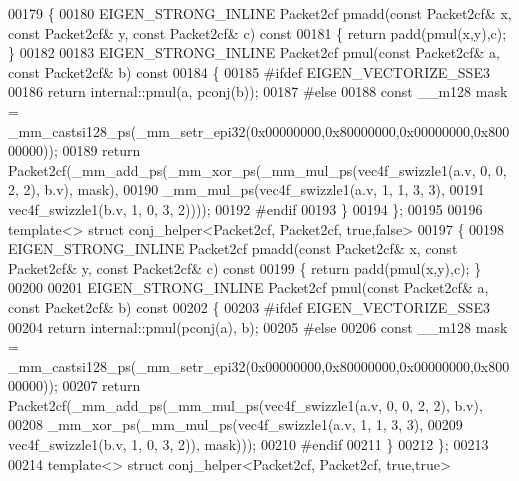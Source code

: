 \begin{DoxyCode}
00179 \{
00180   EIGEN\_STRONG\_INLINE Packet2cf pmadd(\textcolor{keyword}{const} Packet2cf& x, \textcolor{keyword}{const} Packet2cf& y, \textcolor{keyword}{const} Packet2cf& c)\textcolor{keyword}{ const}
00181 \textcolor{keyword}{  }\{ \textcolor{keywordflow}{return} padd(pmul(x,y),c); \}
00182 
00183   EIGEN\_STRONG\_INLINE Packet2cf pmul(\textcolor{keyword}{const} Packet2cf& a, \textcolor{keyword}{const} Packet2cf& b)\textcolor{keyword}{ const}
00184 \textcolor{keyword}{  }\{
00185 \textcolor{preprocessor}{    #ifdef EIGEN\_VECTORIZE\_SSE3}
00186     \textcolor{keywordflow}{return} internal::pmul(a, pconj(b));
00187 \textcolor{preprocessor}{    #else}
00188     \textcolor{keyword}{const} \_\_m128 mask = \_mm\_castsi128\_ps(\_mm\_setr\_epi32(0x00000000,0x80000000,0x00000000,0x80000000));
00189     \textcolor{keywordflow}{return} Packet2cf(\_mm\_add\_ps(\_mm\_xor\_ps(\_mm\_mul\_ps(vec4f\_swizzle1(a.v, 0, 0, 2, 2), b.v), mask),
00190                                 \_mm\_mul\_ps(vec4f\_swizzle1(a.v, 1, 1, 3, 3),
00191                                            vec4f\_swizzle1(b.v, 1, 0, 3, 2))));
00192 \textcolor{preprocessor}{    #endif}
00193   \}
00194 \};
00195 
00196 \textcolor{keyword}{template}<> \textcolor{keyword}{struct }conj\_helper<Packet2cf, Packet2cf, true,false>
00197 \{
00198   EIGEN\_STRONG\_INLINE Packet2cf pmadd(\textcolor{keyword}{const} Packet2cf& x, \textcolor{keyword}{const} Packet2cf& y, \textcolor{keyword}{const} Packet2cf& c)\textcolor{keyword}{ const}
00199 \textcolor{keyword}{  }\{ \textcolor{keywordflow}{return} padd(pmul(x,y),c); \}
00200 
00201   EIGEN\_STRONG\_INLINE Packet2cf pmul(\textcolor{keyword}{const} Packet2cf& a, \textcolor{keyword}{const} Packet2cf& b)\textcolor{keyword}{ const}
00202 \textcolor{keyword}{  }\{
00203 \textcolor{preprocessor}{    #ifdef EIGEN\_VECTORIZE\_SSE3}
00204     \textcolor{keywordflow}{return} internal::pmul(pconj(a), b);
00205 \textcolor{preprocessor}{    #else}
00206     \textcolor{keyword}{const} \_\_m128 mask = \_mm\_castsi128\_ps(\_mm\_setr\_epi32(0x00000000,0x80000000,0x00000000,0x80000000));
00207     \textcolor{keywordflow}{return} Packet2cf(\_mm\_add\_ps(\_mm\_mul\_ps(vec4f\_swizzle1(a.v, 0, 0, 2, 2), b.v),
00208                                 \_mm\_xor\_ps(\_mm\_mul\_ps(vec4f\_swizzle1(a.v, 1, 1, 3, 3),
00209                                                       vec4f\_swizzle1(b.v, 1, 0, 3, 2)), mask)));
00210 \textcolor{preprocessor}{    #endif}
00211   \}
00212 \};
00213 
00214 \textcolor{keyword}{template}<> \textcolor{keyword}{struct }conj\_helper<Packet2cf, Packet2cf, true,true>

\end{DoxyCode}
